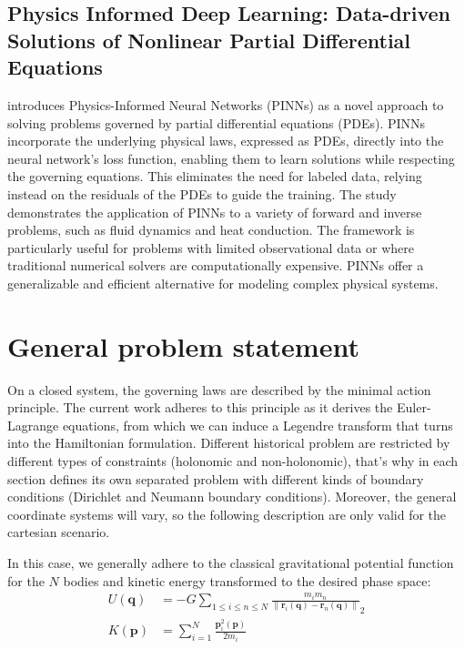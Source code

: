 \documentclass[draft]{agujournal2019}
\newcommand{\norm}[1]{\left\lVert#1\right\rVert}
\begin{document}
\subsection{Physics Informed Deep Learning: Data-driven Solutions of Nonlinear Partial Differential Equations}
\cite{raissi2017physicsinformeddeeplearning} introduces Physics-Informed Neural Networks (PINNs) as a novel approach to solving problems governed by partial differential equations (PDEs). PINNs incorporate the underlying physical laws, expressed as PDEs, directly into the neural network's loss function, enabling them to learn solutions while respecting the governing equations. This eliminates the need for labeled data, relying instead on the residuals of the PDEs to guide the training. The study demonstrates the application of PINNs to a variety of forward and inverse problems, such as fluid dynamics and heat conduction. The framework is particularly useful for problems with limited observational data or where traditional numerical solvers are computationally expensive. PINNs offer a generalizable and efficient alternative for modeling complex physical systems.

\section{General problem statement}
On a closed system, the governing laws are described by the minimal action principle. The current work adheres to this principle as it derives the Euler-Lagrange equations, from which we can induce a Legendre transform that turns into the Hamiltonian formulation. Different historical problem are restricted by different types of constraints (holonomic and non-holonomic), that's why in each section defines its own separated problem with different kinds of boundary conditions (Dirichlet and Neumann boundary conditions). Moreover, the general coordinate systems will vary, so the following description are only valid for the cartesian scenario.

In this case, we generally adhere to the classical gravitational potential function for the $N$ bodies and kinetic energy transformed to the desired phase space:
\begin{align}
    U(\mathbf{q}) &= - G \sum_{1 \leq i \leq n \leq N} \frac{m_i m_n}{\norm{\mathbf{r}_i\left(\mathbf{q}\right) - \mathbf{r}_n\left(\mathbf{q}\right)}}_2 \\
    K(\mathbf{p}) &= \sum_{i = 1}^{N} \frac{\mathbf{p}_i^2\left(\mathbf{p}\right)}{2 m_i}
\end{align}
\end{document}
